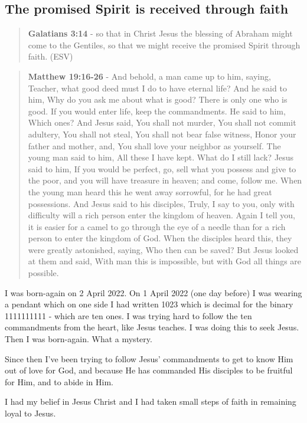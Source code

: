 \documentclass[11pt]{article}
\begin{document}
\subsection{The promised Spirit is received through faith}
\label{sec:orgba6e5a9}
\begin{quote}
\textbf{Galatians 3:14} - so that in Christ Jesus the blessing of Abraham might come to the Gentiles, so that we might receive the promised Spirit through faith. (ESV)
\end{quote}

\begin{quote}
\textbf{Matthew 19:16-26} - And behold, a man came up to him, saying, Teacher, what good deed must I do to have eternal life? And he said to him, Why do you ask me about what is good? There is only one who is good. If you would enter life, keep the commandments. He said to him, Which ones? And Jesus said, You shall not murder, You shall not commit adultery, You shall not steal, You shall not bear false witness, Honor your father and mother, and, You shall love your neighbor as yourself. The young man said to him, All these I have kept. What do I still lack? Jesus said to him, If you would be perfect, go, sell what you possess and give to the poor, and you will have treasure in heaven; and come, follow me. When the young man heard this he went away sorrowful, for he had great possessions. And Jesus said to his disciples, Truly, I say to you, only with difficulty will a rich person enter the kingdom of heaven. Again I tell you, it is easier for a camel to go through the eye of a needle than for a rich person to enter the kingdom of God. When the disciples heard this, they were greatly astonished, saying, Who then can be saved? But Jesus looked at them and said, With man this is impossible, but with God all things are possible.
\end{quote}

I was born-again on 2 April 2022. On 1 April 2022 (one day before) I was wearing a pendant which on one side I had written 1023 which is decimal for the binary 1111111111 - which are ten ones. I was trying hard to follow the ten commandments from the heart, like Jesus teaches. I was doing this to seek Jesus. Then I was born-again. What a mystery.

Since then I've been trying to follow Jesus' commandments to get to know Him out of love for God, and because He has commanded His disciples to be fruitful for Him, and to abide in Him.

I had my belief in Jesus Christ and I had taken small steps of faith in remaining loyal to Jesus.
\end{document}
